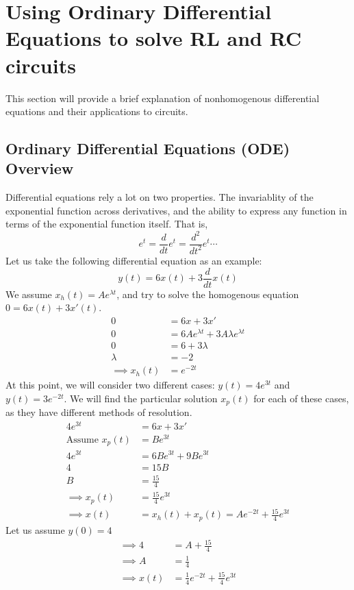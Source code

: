 \documentclass[nobib]{tufte-handout}
\begin{document}
\section{Using Ordinary Differential Equations to solve RL and RC circuits}
This section will provide a brief explanation of nonhomogenous differential equations and their applications to circuits.
\subsection{Ordinary Differential Equations (ODE) Overview}
Differential equations rely a lot on two properties. The invariablity of the exponential function across derivatives, and the ability to express any function in terms of the exponential function itself. That is,\\
\begin{equation*}
    e^t=\frac{d}{dt}e^t=\frac{d^2}{dt^2}e^t \cdots
\end{equation*}
Let us take the following differential equation as an example:
\begin{equation*}
    y(t)=6x(t)+3\frac{d}{dt}x(t)
\end{equation*}
We assume $x_h(t)=Ae^{\lambda t}$, and try to solve the homogenous equation $0=6x(t)+3x'(t)$.
\begin{align*}
    0 &= 6x+3x'\\
    0 &= 6Ae^{\lambda t} + 3A \lambda e^{\lambda t}\\
    0 &= 6+3\lambda\\
    \lambda &= -2\\
    \implies x_h(t) &= e^{-2t}
\end{align*}
At this point, we will consider two different cases: $y(t) = 4e^{3t}$ and $y(t) = 3e^{-2t}$.
We will find the particular solution $x_p(t)$ for each of these cases, as they have different methods of resolution.
\begin{align*}
    4e^{3t} &= 6x+3x'\\
    \text{Assume } x_p(t) &= Be^{3t}\\
    4e^{3t} &= 6Be^{3t} + 9Be^{3t}\\
    4 &= 15B\\
    B &= \frac{15}{4}\\
    \implies x_p(t) &= \frac{15}{4}e^{3t}\\
    \implies x(t) &= x_h(t)+x_p(t)=Ae^{-2t}+\frac{15}{4}e^{3t}
\end{align*}
Let us assume $y(0) = 4$
\begin{align*}
    \implies 4 &= A + \frac{15}{4}\\
    \implies A &= \frac{1}{4}\\
    \implies x(t) &= \frac{1}{4}e^{-2t}+\frac{15}{4}e^{3t}
\end{align*}
\end{document}
